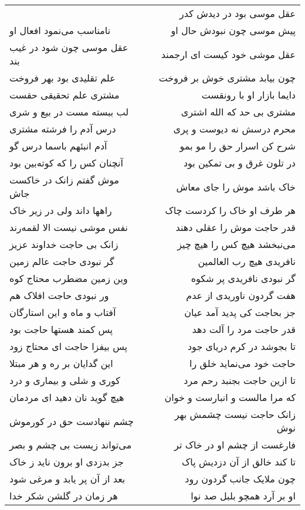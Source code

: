 \begin{center}
\begin{longtable}{l p{0.5cm} r}
&&
عقل موسی بود در دیدش کدر
\\
نامناسب می‌نمود افعال او
&&
پیش موسی چون نبودش حال او
\\
عقل موسی چون شود در غیب بند
&&
عقل موشی خود کیست ای ارجمند
\\
علم تقلیدی بود بهر فروخت
&&
چون بیابد مشتری خوش بر فروخت
\\
مشتری علم تحقیقی حقست
&&
دایما بازار او با رونقست
\\
لب ببسته مست در بیع و شری
&&
مشتری بی حد که الله اشتری
\\
درس آدم را فرشته مشتری
&&
محرم درسش نه دیوست و پری
\\
آدم انبئهم باسما درس گو
&&
شرح کن اسرار حق را مو بمو
\\
آنچنان کس را که کوته‌بین بود
&&
در تلون غرق و بی تمکین بود
\\
موش گفتم زانک در خاکست جاش
&&
خاک باشد موش را جای معاش
\\
راهها داند ولی در زیر خاک
&&
هر طرف او خاک را کردست چاک
\\
نفس موشی نیست الا لقمه‌رند
&&
قدر حاجت موش را عقلی دهند
\\
زانک بی حاجت خداوند عزیز
&&
می‌نبخشد هیچ کس را هیچ چیز
\\
گر نبودی حاجت عالم زمین
&&
نافریدی هیچ رب العالمین
\\
وین زمین مضطرب محتاج کوه
&&
گر نبودی نافریدی پر شکوه
\\
ور نبودی حاجت افلاک هم
&&
هفت گردون ناوریدی از عدم
\\
آفتاب و ماه و این استارگان
&&
جز بحاجت کی پدید آمد عیان
\\
پس کمند هستها حاجت بود
&&
قدر حاجت مرد را آلت دهد
\\
پس بیفزا حاجت ای محتاج زود
&&
تا بجوشد در کرم دریای جود
\\
این گدایان بر ره و هر مبتلا
&&
حاجت خود می‌نماید خلق را
\\
کوری و شلی و بیماری و درد
&&
تا ازین حاجت بجنبد رحم مرد
\\
هیچ گوید نان دهید ای مردمان
&&
که مرا مالست و انبارست و خوان
\\
چشم ننهادست حق در کورموش
&&
زانک حاجت نیست چشمش بهر نوش
\\
می‌تواند زیست بی چشم و بصر
&&
فارغست از چشم او در خاک تر
\\
جز بدزدی او برون ناید ز خاک
&&
تا کند خالق از آن دزدیش پاک
\\
بعد از آن پر یابد و مرغی شود
&&
چون ملایک جانب گردون رود
\\
هر زمان در گلشن شکر خدا
&&
او بر آرد همچو بلبل صد نوا
\\

\end{longtable}
\end{center}
